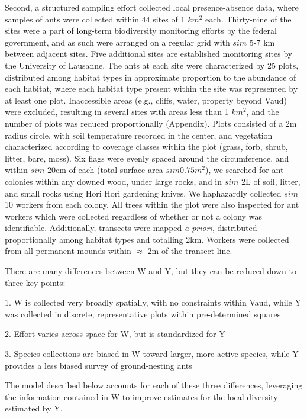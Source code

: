 \documentclass[preprint,review,times,12pt]{elsarticle}
\begin{document}
Second, a structured sampling effort collected local presence-absence data, where samples of ants were collected within 44 sites of 1 $km^2$ each. Thirty-nine of the sites were a part of long-term biodiversity monitoring efforts by the federal government, and as such were arranged on a regular grid with $sim$ 5-7 km between adjacent sites. Five additional sites are established monitoring sites by the University of Lausanne. The ants at each site were characterized by 25 plots, distributed among habitat types in approximate proportion to the abundance of each habitat, where each habitat type present within the site was represented by at least one plot. Inaccessible areas (e.g., cliffs, water, property beyond Vaud) were excluded, resulting in several sites with areas less than 1 $km^2$, and the number of plots was reduced proportionally (Appendix). Plots consisted of a 2m radius circle, with soil temperature recorded in the center, and vegetation characterized according to coverage classes within the plot (grass, forb, shrub, litter, bare, moss). Six flags were evenly spaced around the circumference, and within $sim$ 20cm of each (total surface area $sim 0.75 m^2$), we searched for ant colonies within any downed wood, under large rocks, and in $sim$ 2L of soil, litter, and small rocks using Hori Hori gardening knives. We haphazardly collected $sim$ 10 workers from each colony. All trees within the plot were also inspected for ant workers which were collected regardless of whether or not a colony was identifiable. Additionally, transects were mapped \emph{a priori}, distributed proportionally among habitat types and totalling 2km. Workers were collected from all permanent mounds within $\approx$ 2m of the transect line. 


There are many differences between W and Y, but they can be reduced down to three key points:

1. W is collected very broadly spatially, with no constraints within Vaud, while Y was collected in discrete, representative plots within pre-determined squares

2. Effort varies across space for W, but is standardized for Y

3. Species collections are biased in W toward larger, more active species, while Y provides a less biased survey of ground-nesting ants

The model described below accounts for each of these three differences, leveraging the information contained in W to improve estimates for the local diversity estimated by Y.
\end{document}

